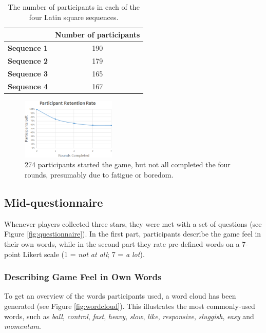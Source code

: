 \begin{table} \centering
\caption{The number of participants in each of the four Latin square sequences.}
\label{table:latinSequenceNumber}
\begin{tabular}{cc}
\toprule
& \textbf{Number of participants}\\
\midrule
\textbf{Sequence 1} & 190\\
\textbf{Sequence 2} & 179\\
\textbf{Sequence 3} & 165\\
\textbf{Sequence 4} & 167\\
\bottomrule
\end{tabular}
\end{table}

\begin{figure}[htbp]
\centering
\includegraphics[width=0.4\textwidth]{Pics/retetionRate}
\caption{274 participants started the game, but not all completed the four rounds, presumably due to fatigue or boredom.}
\label{fig:retention}
\end{figure}

\subsection{Mid-questionnaire}
Whenever players collected three stars, they were met with a set of questions (see Figure \ref{fig:questionnaire}). In the first part, participants describe the game feel in their own words, while in the second part they rate pre-defined words on a 7-point Likert scale (1 = \textit{not at all}; 7 = \textit{a lot}).

\subsubsection{Describing Game Feel in Own Words}
To get an overview of the words participants used, a word cloud has been generated (see Figure \ref{fig:wordcloud}). This illustrates the most commonly-used words, such as \textit{ball}, \textit{control}, \textit{fast}, \textit{heavy}, \textit{slow}, \textit{like}, \textit{responsive}, \textit{sluggish}, \textit{easy} and \textit{momentum}.

